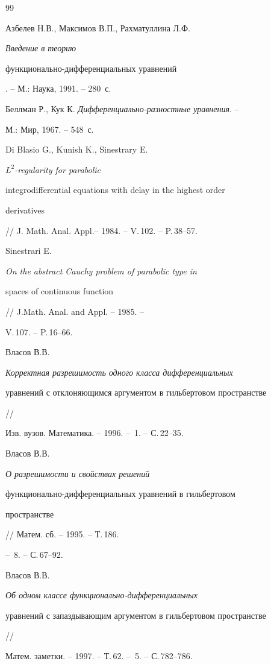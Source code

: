 \begin{thebibliography}{99}







Азбелев Н.В., Максимов В.П., Рахматуллина Л.Ф. {\em Введение в теорию


функционально-дифференциальных уравнений}. -- М.: Наука, 1991. -- 280~с.




Беллман Р., Кук К. {\em Дифференциально-разностные уравнения}. --


М.: Мир, 1967. -- 548~с.




Di Blasio G., Kunish K., Sinestrary E. {\em $L^2$-regularity for parabolic


integrodifferential equations with delay in the highest order


derivatives} // J. Math. Anal. Appl.-- 1984. -- V.\,102. -- P.\,38--57.




Sinestrari E. {\em On the abstract Cauchy problem of parabolic type in


spaces of continuous function} // J.Math. Anal. and Appl. -- 1985. --


V.\,107. -- P.\,16--66.




Власов В.В. {\em Корректная разрешимость одного класса дифференциальных


уравнений с отклоняющимся аргументом в гильбертовом пространстве} //


Изв. вузов. Математика. -- 1996. -- \No\,1. -- С.\,22--35.




Власов В.В. {\em О разрешимости и свойствах решений


функционально-дифференциальных уравнений в гильбертовом


пространстве} // Матем. сб. -- 1995. -- Т.\,186.


-- \No\,8. -- С.\,67--92.




Власов В.В. {\em Об одном классе функционально-дифференциальных


уравнений с запаздывающим аргументом в гильбертовом пространстве} //


Матем. заметки. -- 1997. -- Т.\,62. -- \No\,5. -- С.\,782--786.





\end{thebibliography}
